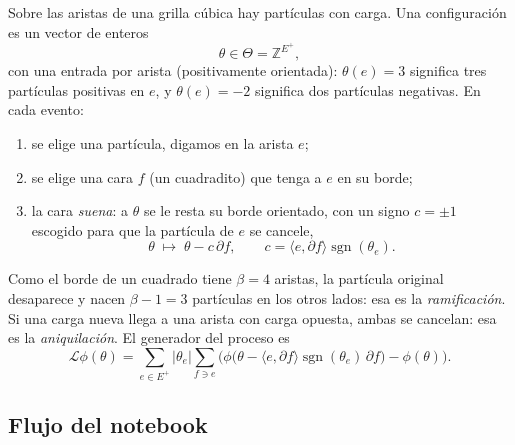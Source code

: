 \documentclass[11pt,a4paper]{article}
\theoremstyle{plain}
\theoremstyle{remark}
\newcommand{\Z}{\mathbb{Z}}
\newcommand{\Lgen}{\mathcal{L}}
\DeclareMathOperator{\sgn}{sgn}
\newcommand{\ip}[2]{\langle #1,#2\rangle}
\begin{document}
Sobre las aristas de una grilla cúbica hay partículas con carga. Una configuración es un vector de enteros
\[
\theta\in\Theta=\Z^{E^+},
\]
con una entrada por arista (positivamente orientada): $\theta(e)=3$ significa tres partículas positivas en $e$, y $\theta(e)=-2$ significa dos partículas negativas. En cada evento:
\begin{enumerate}[nosep]
  \item se elige una partícula, digamos en la arista $e$;
  \item se elige una cara $f$ (un cuadradito) que tenga a $e$ en su borde;
  \item la cara \emph{suena}: a $\theta$ se le resta su borde orientado, con un signo $c=\pm1$ escogido para que la partícula de $e$ se cancele,
  \[
  \theta\;\longmapsto\;\theta-c\,\partial f,\qquad c=\ip{e}{\partial f}\sgn(\theta_e).
  \]
\end{enumerate}
Como el borde de un cuadrado tiene $\beta=4$ aristas, la partícula original desaparece y nacen $\beta-1=3$ partículas en los otros lados: esa es la \emph{ramificación}. Si una carga nueva llega a una arista con carga opuesta, ambas se cancelan: esa es la \emph{aniquilación}. El generador del proceso es
\[
\Lgen\phi(\theta)=\sum_{e\in E^+}|\theta_e|\sum_{f\ni e}\Big(\phi\big(\theta-\ip{e}{\partial f}\sgn(\theta_e)\,\partial f\big)-\phi(\theta)\Big).
\]

\subsection{Flujo del notebook}

\begin{center}
\end{center}
\end{document}
